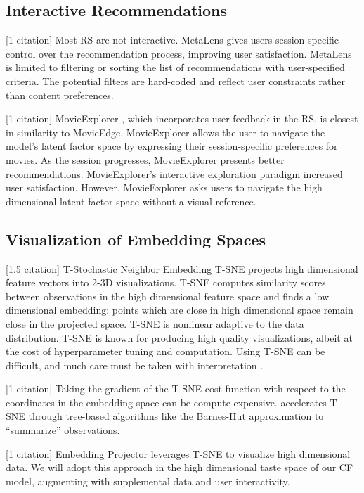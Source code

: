 \subsection{Interactive Recommendations}

[1 citation] Most RS are not interactive. MetaLens \cite{schafer2002meta}gives users session-specific control over the recommendation process, improving user satisfaction. MetaLens is limited to filtering or sorting the list of recommendations with user-specified criteria. The potential filters are hard-coded and reflect user constraints rather than content preferences. 

[1 citation] MovieExplorer \cite{taijala2018movieexplorer}, which incorporates user feedback in the RS, is closest in similarity to MovieEdge. MovieExplorer allows the user to navigate the model's latent factor space by expressing their session-specific preferences for movies.  As the session progresses, MovieExplorer presents better recommendations. MovieExplorer’s interactive exploration paradigm increased user satisfaction. However, MovieExplorer asks users to navigate the high dimensional latent factor space without a visual reference. 

\subsection{Visualization of Embedding Spaces}

[1.5 citation] T-Stochastic Neighbor Embedding \mbox{T-SNE} \cite{maaten2008visualizing} projects high dimensional feature vectors into 2-3D visualizations. \mbox{T-SNE} computes similarity scores between observations in the high dimensional feature space and finds a low dimensional embedding: points which are close in high dimensional space remain close in the projected space. \mbox{T-SNE} is nonlinear adaptive to the data distribution. \mbox{T-SNE} is known for producing high quality visualizations, albeit at the cost of hyperparameter tuning and computation. Using \mbox{T-SNE} can be difficult, and much care must be taken with interpretation \cite{wattenberg2016how}.

[1 citation] Taking the gradient of the \mbox{T-SNE} cost function with respect to the coordinates in the embedding space can be compute expensive.  \cite{van2014accelerating} accelerates \mbox{T-SNE} through tree-based algorithms like the Barnes-Hut approximation to “summarize” observations.  

[1 citation] Embedding Projector \cite{smilkov2016embedding} leverages \mbox{T-SNE} to visualize high dimensional data. We will adopt this approach in the high dimensional taste space of our CF model, augmenting with supplemental data and user interactivity. 

